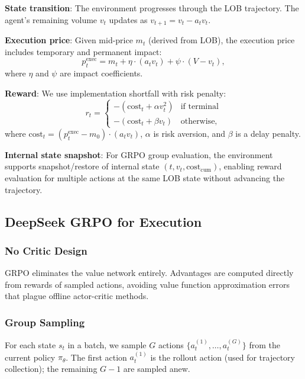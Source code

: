 \documentclass{article}
\begin{document}
\textbf{State transition}: The environment progresses through the LOB trajectory. The agent's remaining volume $v_t$ updates as $v_{t+1} = v_t - a_t v_t$.

\textbf{Execution price}: Given mid-price $m_t$ (derived from LOB), the execution price includes temporary and permanent impact:
\begin{equation}
    p_t^{\text{exec}} = m_t + \eta \cdot (a_t v_t) + \psi \cdot (V - v_t),
\end{equation}
where $\eta$ and $\psi$ are impact coefficients.

\textbf{Reward}: We use implementation shortfall with risk penalty:
\begin{equation}
    r_t = \begin{cases}
        - \left( \text{cost}_t + \alpha v_t^2 \right) & \text{if terminal} \\
        - \left( \text{cost}_t + \beta v_t \right) & \text{otherwise},
    \end{cases}
\end{equation}
where $\text{cost}_t = (p_t^{\text{exec}} - m_0) \cdot (a_t v_t)$, $\alpha$ is risk aversion, and $\beta$ is a delay penalty.

\textbf{Internal state snapshot}: For GRPO group evaluation, the environment supports snapshot/restore of internal state $(t, v_t, \text{cost}_{\text{cum}})$, enabling reward evaluation for multiple actions at the same LOB state without advancing the trajectory.

\subsection{DeepSeek GRPO for Execution}
\label{subsec:grpo}

\subsubsection{No Critic Design}
GRPO eliminates the value network entirely. Advantages are computed directly from rewards of sampled actions, avoiding value function approximation errors that plague offline actor-critic methods.

\subsubsection{Group Sampling}
For each state $s_t$ in a batch, we sample $G$ actions $\{a_t^{(1)}, \dots, a_t^{(G)}\}$ from the current policy $\pi_\theta$. The first action $a_t^{(1)}$ is the rollout action (used for trajectory collection); the remaining $G-1$ are sampled anew.
\end{document}
